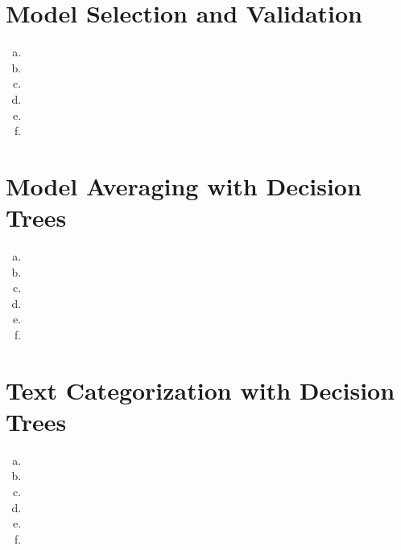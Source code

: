 \documentclass{article}
\begin{document}
\thispagestyle{fancy}

\section{Model Selection and Validation}

\begin{enumerate}[(a)]
\item 
\item 
\item 
\item
\item 
\item 
\end{enumerate}

\section{Model Averaging with Decision Trees}

\begin{enumerate}[(a)]
\item 
\item 
\item 
\item
\item 
\item 
\end{enumerate}

\section{Text Categorization with Decision Trees}

\begin{enumerate}[(a)]
\item 
\item 
\item 
\item
\item 
\item 
\end{enumerate}
\end{document}
